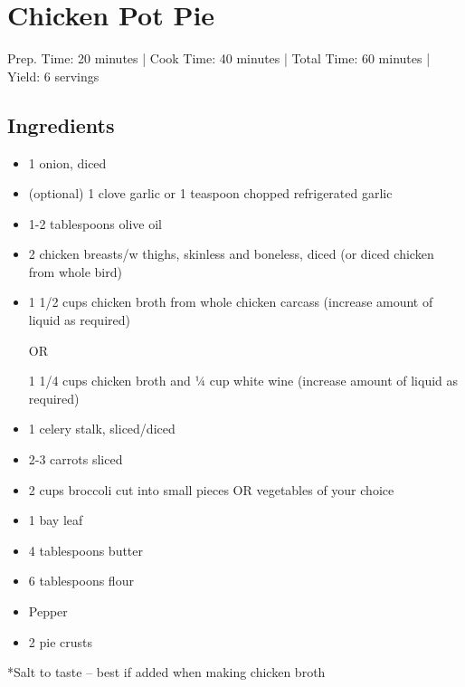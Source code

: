 \section{Chicken Pot Pie}

\begin{center}
Prep. Time: 20 minutes |
Cook Time: 40 minutes | 
Total Time: 60 minutes | 
Yield: 6 servings
\end{center}

\subsection{Ingredients}
\begin{itemize}
    \item 1 onion, diced
    \item (optional) 1 clove garlic or 1 teaspoon chopped refrigerated garlic 
    \item 1-2 tablespoons olive oil
    \item 2 chicken breasts/w thighs, skinless and boneless, diced (or diced chicken from whole bird)
    \item 1 1/2 cups chicken broth from whole chicken carcass
          (increase amount of liquid as required)\par
          OR \par
          1 1/4 cups chicken broth and ¼ cup white wine (increase amount of liquid as required)
    \item 1 celery stalk, sliced/diced
    \item 2-3 carrots sliced
    \item 2 cups broccoli cut into small pieces OR vegetables of your choice
    \item 1 bay leaf
    \item 4 tablespoons butter
    \item 6 tablespoons flour
    \item Pepper
    \item 2 pie crusts
\end{itemize}
*Salt to taste – best if added when making chicken broth 

